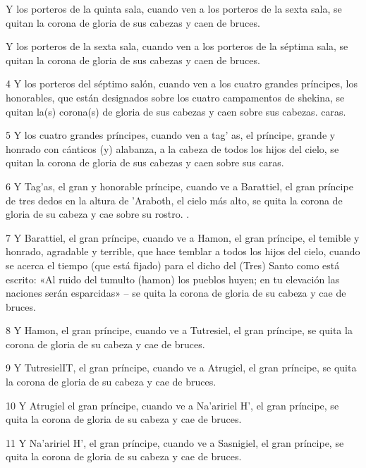 \par Y los porteros de la quinta sala, cuando ven a los porteros de la sexta sala, se quitan la corona de gloria de sus cabezas y caen de bruces.

\par Y los porteros de la sexta sala, cuando ven a los porteros de la séptima sala, se quitan la corona de gloria de sus cabezas y caen de bruces.

\par 4 Y los porteros del séptimo salón, cuando ven a los cuatro grandes príncipes, los honorables, que están designados sobre los cuatro campamentos de shekina, se quitan la(s) corona(s) de gloria de sus cabezas y caen sobre sus cabezas. caras.

\par 5 Y los cuatro grandes príncipes, cuando ven a tag' as, el príncipe, grande y honrado con cánticos (y) alabanza, a la cabeza de todos los hijos del cielo, se quitan la corona de gloria de sus cabezas y caen sobre sus caras.

\par 6 Y Tag'as, el gran y honorable príncipe, cuando ve a Barattiel, el gran príncipe de tres dedos en la altura de 'Araboth, el cielo más alto, se quita la corona de gloria de su cabeza y cae sobre su rostro. .

\par 7 Y Barattiel, el gran príncipe, cuando ve a Hamon, el gran príncipe, el temible y honrado, agradable y terrible, que hace temblar a todos los hijos del cielo, cuando se acerca el tiempo (que está fijado) para el dicho del (Tres) Santo como está escrito: «Al ruido del tumulto (hamon) los pueblos huyen; en tu elevación las naciones serán esparcidas» – se quita la corona de gloria de su cabeza y cae de bruces.

\par 8 Y Hamon, el gran príncipe, cuando ve a Tutresiel, el gran príncipe, se quita la corona de gloria de su cabeza y cae de bruces.

\par 9 Y TutresielIT, el gran príncipe, cuando ve a Atrugiel, el gran príncipe, se quita la corona de gloria de su cabeza y cae de bruces.

\par 10 Y Atrugiel el gran príncipe, cuando ve a Na'aririel H', el gran príncipe, se quita la corona de gloria de su cabeza y cae de bruces.

\par 11 Y Na'aririel H', el gran príncipe, cuando ve a Sasnigiel, el gran príncipe, se quita la corona de gloria de su cabeza y cae de bruces.

